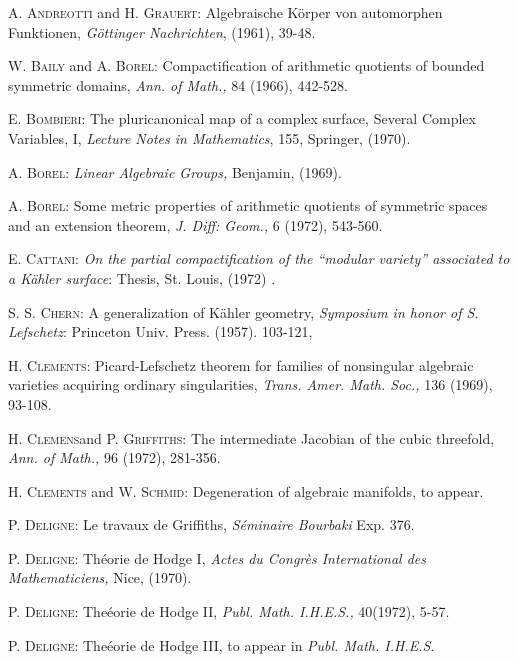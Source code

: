 \begin{thebibliography}{99}
 \textsc{A. Andreotti} and \textsc{H. Grauert}:  Algebraische K\"orper von automorphen Funktionen, \textit{G\"ottinger Nachrichten}, (1961), 39-48.

 \textsc{W. Baily} and \textsc{A. Borel}: Compactification of arithmetic quotients of bounded symmetric domains, \textit{Ann. of Math.,} 84 (1966), 442-528.

 \textsc{E. Bombieri}: The pluricanonical map of a complex surface, Several Complex Variables, I, \textit{Lecture Notes in Mathematics}, 155, Springer, (1970).

 \textsc{A. Borel}: \textit{Linear Algebraic Groups,} Benjamin, (1969).

 \textsc{A. Borel}: Some metric properties of arithmetic quotients of symmetric spaces and an extension theorem, \textit{J. Diff: Geom.,} 6 (1972), 543-560.

 \textsc{E. Cattani}: \textit{On the partial compactification of the ``modular variety'' associated to a K\"ahler surface}: Thesis, St. Louis, (1972) .

 \textsc{S. S. Chern}: A generalization of K\"ahler geometry, \textit{Symposium in honor of S. Lefschetz}: Princeton Univ. Press. (1957). 103-121,

 \textsc{H. Clements}: Picard-Lefschetz theorem for families of nonsingular algebraic varieties acquiring ordinary singularities, \textit{Trans. Amer. Math. Soc.,} 136 (1969), 93-108.

 \textsc{H. Clemens}\pageoriginale and \textsc{P. Griffiths}: The intermediate Jacobian of the cubic threefold, \textit{Ann. of Math.,} 96 (1972), 281-356.

 \textsc{H. Clements} and \textsc{W. Schmid}: Degeneration of algebraic manifolds, to appear.

 \textsc{P. Deligne}: Le travaux de Griffiths,  \textit{S\'eminaire Bourbaki} Exp. 376.

 \textsc{P. Deligne}: Th\'eorie de Hodge I, \textit{Actes du Congr\`es International des Mathematiciens,} Nice, (1970).

 \textsc{P. Deligne}: The\'eorie de Hodge II, \textit{Publ. Math. I.H.E.S.,} 40(1972), 5-57.

 \textsc{P. Deligne}: The\'eorie de Hodge III, to appear in \textit{Publ. Math. I.H.E.S.} 


\end{thebibliography}
